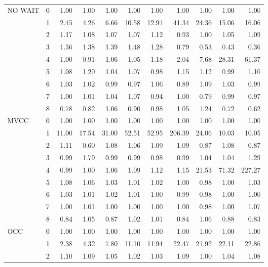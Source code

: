 \begin{tabular}{llrrrrrrrrr}
NO WAIT & 0 &  1.00 &  1.00 &  1.00 &  1.00 &  1.00 &   1.00 &   1.00 &   1.00 &   1.00 \\
       & 1 &  2.45 &  4.26 &  6.66 & 10.58 & 12.91 &  41.34 &  24.36 &  15.06 &  16.06 \\
       & 2 &  1.17 &  1.08 &  1.07 &  1.07 &  1.12 &   0.93 &   1.00 &   1.05 &   1.09 \\
       & 3 &  1.36 &  1.38 &  1.39 &  1.48 &  1.28 &   0.79 &   0.53 &   0.43 &   0.36 \\
       & 4 &  1.00 &  0.91 &  1.06 &  1.05 &  1.18 &   2.04 &   7.68 &  28.31 &  61.37 \\
       & 5 &  1.08 &  1.20 &  1.04 &  1.07 &  0.98 &   1.15 &   1.12 &   0.99 &   1.10 \\
       & 6 &  1.03 &  1.02 &  0.99 &  0.97 &  1.06 &   0.89 &   1.09 &   1.03 &   0.99 \\
       & 7 &  1.00 &  1.01 &  1.04 &  1.07 &  0.94 &   1.00 &   0.79 &   0.99 &   0.97 \\
       & 8 &  0.78 &  0.82 &  1.06 &  0.90 &  0.98 &   1.05 &   1.24 &   0.72 &   0.62 \\
MVCC & 0 &  1.00 &  1.00 &  1.00 &  1.00 &  1.00 &   1.00 &   1.00 &   1.00 &   1.00 \\
       & 1 & 11.00 & 17.54 & 31.00 & 52.51 & 52.95 & 206.39 &  24.06 &  10.03 &  10.05 \\
       & 2 &  1.11 &  0.60 &  1.08 &  1.06 &  1.09 &   1.09 &   0.87 &   1.08 &   0.87 \\
       & 3 &  0.99 &  1.79 &  0.99 &  0.99 &  0.98 &   0.99 &   1.04 &   1.04 &   1.29 \\
       & 4 &  0.99 &  1.00 &  1.06 &  1.09 &  1.12 &   1.15 &  21.53 &  71.32 & 227.27 \\
       & 5 &  1.08 &  1.06 &  1.03 &  1.01 &  1.02 &   1.00 &   0.98 &   1.00 &   1.03 \\
       & 6 &  1.03 &  1.01 &  1.02 &  1.01 &  1.00 &   0.99 &   0.98 &   1.00 &   1.00 \\
       & 7 &  1.00 &  1.01 &  1.00 &  1.00 &  1.00 &   1.00 &   0.98 &   1.00 &   1.07 \\
       & 8 &  0.84 &  1.05 &  0.87 &  1.02 &  1.01 &   0.84 &   1.06 &   0.88 &   0.83 \\
OCC & 0 &  1.00 &  1.00 &  1.00 &  1.00 &  1.00 &   1.00 &   1.00 &   1.00 &   1.00 \\
       & 1 &  2.38 &  4.32 &  7.80 & 11.10 & 11.94 &  22.47 &  21.92 &  22.11 &  22.86 \\
       & 2 &  1.10 &  1.09 &  1.05 &  1.02 &  1.03 &   1.09 &   1.00 &   1.04 &   1.08 \\

\end{tabular}
